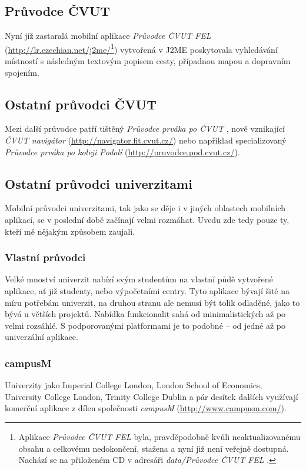 \subsection{Průvodce ČVUT}
Nyní již zastaralá mobilní aplikace \emph{Průvodce ČVUT FEL} (\url{http://lr.czechian.net/j2me/}\footnote{Aplikace \emph{Průvodce ČVUT FEL} byla, pravděpodobně kvůli neaktualizovanému obsahu a celkovému nedokončení, stažena a nyní již není veřejně dostupná. Nachází se na přiloženém CD v adresáři \textit{data/Průvodce ČVUT FEL} .}) vytvořená v J2ME poskytovala vyhledávání místností s následným textovým popisem cesty, případnou mapou a dopravním spojením.

\subsection{Ostatní průvodci ČVUT}
Mezi další průvodce patří tištěný \emph{Průvodce prváka po ČVUT} \cite{PruvodcePrvaka}, nově vznikající \emph{ČVUT navigátor} (\url{http://navigator.fit.cvut.cz/}) nebo například specializovaný \emph{Průvodce prváka po koleji Podolí} (\url{http://pruvodce.pod.cvut.cz/}).

\subsection{Ostatní průvodci univerzitami}
Mobilní průvodci univerzitami, tak jako se děje i v jiných oblastech mobilních aplikací, se v poslední době začínají velmi rozmáhat. Uvedu zde tedy pouze ty, kteří mě nějakým způsobem zaujali.

\subsubsection{Vlastní průvodci}
Velké mnoství univerzit nabízí svým studentům na vlastní půdě vytvořené aplikace, ať již studenty, nebo výpočetními centry. Tyto aplikace bývají šité na míru potřebám univerzit, na druhou stranu ale nemusí být tolik odladěné, jako to bývá u větších projektů. Nabídka funkcionalit sahá od minimalistických až po velmi rozsáhlé. S podporovanými platformami je to podobné -- od jedné až po univerzální aplikace.

\subsubsection{campusM}
Univerzity jako Imperial College London, London School of Economics, University College London, Trinity College Dublin a pár desítek dalších využívají komerční aplikace z dílen společnosti \emph{campusM} (\url{http://www.campusm.com/}).

